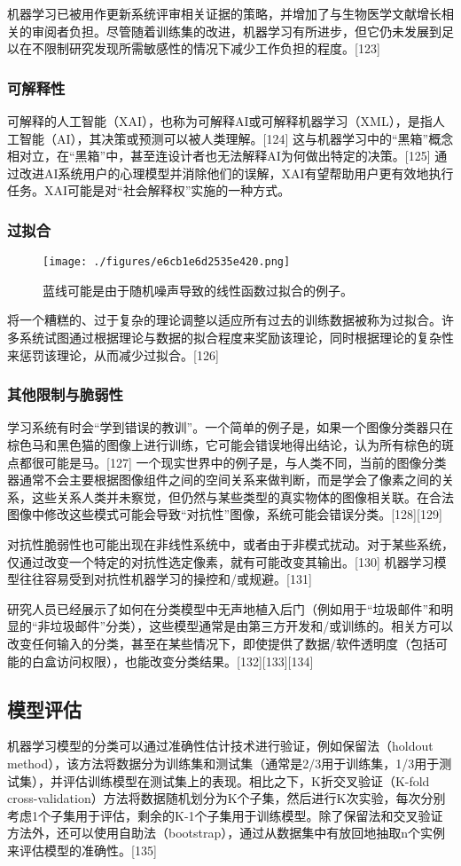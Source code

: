 机器学习已被用作更新系统评审相关证据的策略，并增加了与生物医学文献增长相关的审阅者负担。尽管随着训练集的改进，机器学习有所进步，但它仍未发展到足以在不限制研究发现所需敏感性的情况下减少工作负担的程度。[123]
\subsubsection{可解释性}
可解释的人工智能（XAI），也称为可解释AI或可解释机器学习（XML），是指人工智能（AI），其决策或预测可以被人类理解。[124] 这与机器学习中的“黑箱”概念相对立，在“黑箱”中，甚至连设计者也无法解释AI为何做出特定的决策。[125] 通过改进AI系统用户的心理模型并消除他们的误解，XAI有望帮助用户更有效地执行任务。XAI可能是对“社会解释权”实施的一种方式。
\subsubsection{过拟合}
\begin{figure}[ht]
\centering
\texttt{[image: ./figures/e6cb1e6d2535e420.png]}
\caption{蓝线可能是由于随机噪声导致的线性函数过拟合的例子。} \label{fig_JQXX_10}
\end{figure}
将一个糟糕的、过于复杂的理论调整以适应所有过去的训练数据被称为过拟合。许多系统试图通过根据理论与数据的拟合程度来奖励该理论，同时根据理论的复杂性来惩罚该理论，从而减少过拟合。[126]
\subsubsection{其他限制与脆弱性}
学习系统有时会“学到错误的教训”。一个简单的例子是，如果一个图像分类器只在棕色马和黑色猫的图像上进行训练，它可能会错误地得出结论，认为所有棕色的斑点都很可能是马。[127] 一个现实世界中的例子是，与人类不同，当前的图像分类器通常不会主要根据图像组件之间的空间关系来做判断，而是学会了像素之间的关系，这些关系人类并未察觉，但仍然与某些类型的真实物体的图像相关联。在合法图像中修改这些模式可能会导致“对抗性”图像，系统可能会错误分类。[128][129]

对抗性脆弱性也可能出现在非线性系统中，或者由于非模式扰动。对于某些系统，仅通过改变一个特定的对抗性选定像素，就有可能改变其输出。[130] 机器学习模型往往容易受到对抗性机器学习的操控和/或规避。[131]

研究人员已经展示了如何在分类模型中无声地植入后门（例如用于“垃圾邮件”和明显的“非垃圾邮件”分类），这些模型通常是由第三方开发和/或训练的。相关方可以改变任何输入的分类，甚至在某些情况下，即使提供了数据/软件透明度（包括可能的白盒访问权限），也能改变分类结果。[132][133][134]
\subsection{模型评估}  
机器学习模型的分类可以通过准确性估计技术进行验证，例如保留法（holdout method），该方法将数据分为训练集和测试集（通常是2/3用于训练集，1/3用于测试集），并评估训练模型在测试集上的表现。相比之下，K折交叉验证（K-fold cross-validation）方法将数据随机划分为K个子集，然后进行K次实验，每次分别考虑1个子集用于评估，剩余的K-1个子集用于训练模型。除了保留法和交叉验证方法外，还可以使用自助法（bootstrap），通过从数据集中有放回地抽取n个实例来评估模型的准确性。[135]

